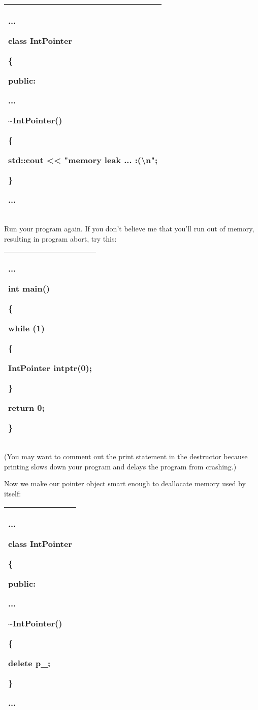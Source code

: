 \documentclass[
]{article}
\begin{document}
\begin{longtable}[]{@{}l@{}}
\toprule
\endhead
\begin{minipage}[t]{0.97\columnwidth}\raggedright
...

class IntPointer

\{

public:

...

\textasciitilde IntPointer()

\{

std::cout \textless\textless{} "memory leak ... :(\textbackslash n";

\}

...\strut
\end{minipage}\tabularnewline
\bottomrule
\end{longtable}

Run your program again. If you don't believe me that you'll run out of
memory, resulting in program abort, try this:

\begin{longtable}[]{@{}l@{}}
\toprule
\endhead
\begin{minipage}[t]{0.97\columnwidth}\raggedright
...

int main()

\{

while (1)

\{

IntPointer intptr(0);

\}

return 0;

\}\strut
\end{minipage}\tabularnewline
\bottomrule
\end{longtable}

(You may want to comment out the print statement in the destructor
because printing slows down your program and delays the program from
crashing.)

Now we make our pointer object smart enough to deallocate memory used by
itself:

\begin{longtable}[]{@{}l@{}}
\toprule
\endhead
\begin{minipage}[t]{0.97\columnwidth}\raggedright
...

class IntPointer

\{

public:

...

\textasciitilde IntPointer()

\{

delete p\_;

\}

...\strut
\end{minipage}\tabularnewline
\bottomrule
\end{longtable}
\end{document}
